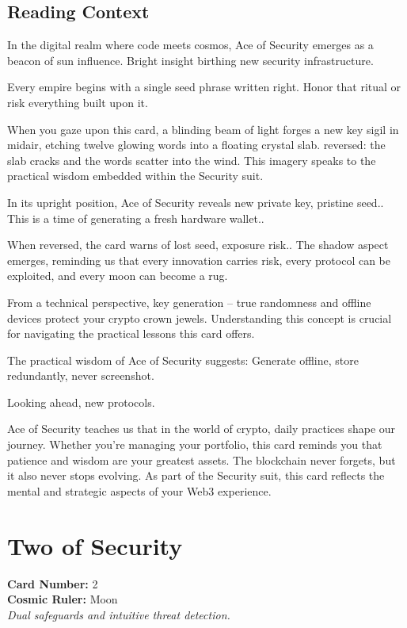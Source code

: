 \documentclass[11pt,oneside]{book}
\begin{document}
\begin{minipage}[t]{0.55\textwidth}
  \subsection*{Reading Context}
  In the digital realm where code meets cosmos, Ace of Security emerges as a beacon of sun influence. Bright insight birthing new security infrastructure.

  Every empire begins with a single seed phrase written right. Honor that ritual or risk everything built upon it.

  When you gaze upon this card, a blinding beam of light forges a new key sigil in midair, etching twelve glowing words into a floating crystal slab. reversed: the slab cracks and the words scatter into the wind. This imagery speaks to the practical wisdom embedded within the Security suit.

  In its upright position, Ace of Security reveals new private key, pristine seed.. This is a time of generating a fresh hardware wallet..

  When reversed, the card warns of lost seed, exposure risk.. The shadow aspect emerges, reminding us that every innovation carries risk, every protocol can be exploited, and every moon can become a rug.

  From a technical perspective, key generation – true randomness and offline devices protect your crypto crown jewels. Understanding this concept is crucial for navigating the practical lessons this card offers.

  The practical wisdom of Ace of Security suggests: Generate offline, store redundantly, never screenshot.

  Looking ahead, new protocols.

  Ace of Security teaches us that in the world of crypto, daily practices shape our journey. Whether you're managing your portfolio, this card reminds you that patience and wisdom are your greatest assets. The blockchain never forgets, but it also never stops evolving. As part of the Security suit, this card reflects the mental and strategic aspects of your Web3 experience.

\end{minipage}

\newpage
\section*{Two of Security}

\begin{minipage}[t]{0.55\textwidth}
  \vspace{0pt}
  \textbf{Card Number:} 2\\  \textbf{Cosmic Ruler:} Moon\\  \textit{Dual safeguards and intuitive threat detection.}
\end{minipage}
\end{document}
